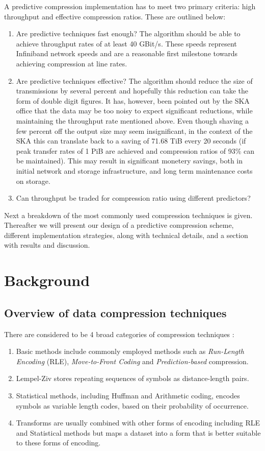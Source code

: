 A predictive compression implementation has to meet two primary criteria: high throughput and effective compression ratios. These are outlined below:
\begin{enumerate}
 \item Are predictive techniques fast enough? The algorithm should be able to achieve throughput rates of at least 40 GBit/s. These speeds represent Infiniband network speeds 
 and are a reasonable first milestone towards achieving compression at line rates.
 \item Are predictive techniques effective? The algorithm should reduce the size of transmissions by several percent and hopefully this reduction can take the form of 
       double digit figures. It has, however, been pointed out by the SKA office that the data may be too noisy to expect significant reductions, while maintaining the throughput 
       rate mentioned above. Even though shaving a few percent off the output size may seem insignificant, in the context of the SKA this can translate back to a saving of 71.68 TiB
       every 20 seconds (if peak transfer rates of 1 PiB are achieved and compression ratios of 93\% can be maintained). This may result in significant monetery savings, both in
       initial network and storage infrastructure, and long term maintenance costs on storage.
 \item Can throughput be traded for compression ratio using different predictors?
\end{enumerate}

Next a breakdown of the most commonly used compression techniques is given. Thereafter we will present our design of a predictive compression scheme, 
different implementation strategies, along with technical details, and a section with results and discussion.
\section{Background}
\subsection{Overview of data compression techniques}
There are considered to be 4 broad categories of compression techniques \cite{salomon2004data}: 
\begin{enumerate}
 \item Basic methods include commonly employed methods such as \textit{Run-Length Encoding} (RLE), \textit{Move-to-Front Coding} and \textit{Prediction-based} compression. 
 \item Lempel-Ziv stores repeating sequences of symbols as distance-length pairs.
 \item Statistical methods, including Huffman and Arithmetic coding, encodes symbols as variable length codes, based on their probability of occurrence.
 \item Transforms are usually combined with other forms of encoding including RLE and Statistical methods but maps a dataset into a form that is better suitable to these
 forms of encoding.
\end{enumerate}
